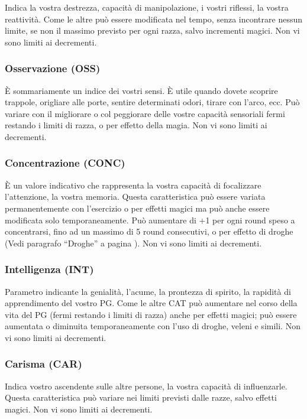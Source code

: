 Indica la vostra destrezza, capacit\`a di manipolazione, i vostri
riflessi, la vostra reattivit\`a. Come le altre pu\`o essere
modificata nel tempo, senza incontrare nessun limite, se non il
massimo previsto per ogni razza, salvo incrementi magici. Non vi sono
limiti ai decrementi.

\subsubsection{Osservazione (OSS)}

\`E sommariamente un indice dei vostri sensi. \`E utile quando dovete
scoprire trappole, origliare alle porte, sentire determinati odori,
tirare con l'arco, ecc. Pu\`o variare con il migliorare o col
peggiorare delle vostre capacit\`a sensoriali fermi restando i limiti
di razza, o per effetto della magia. Non vi sono limiti ai decrementi.

\subsubsection{Concentrazione (CONC)}

\`E un valore indicativo che rappresenta la vostra capacit\`a di
focalizzare l'attenzione, la vostra memoria. Questa caratteristica
pu\`o essere variata permanentemente con l'esercizio o per effetti
magici ma pu\`o anche essere modificata solo temporaneamente.
Pu\`o aumentare di +1 per ogni round speso a concentrarsi, fino ad un
massimo di 5 round consecutivi, o per effetto di droghe (Vedi paragrafo
``Droghe'' a pagina \pageref{droghe}). Non vi sono limiti ai
decrementi.

\subsubsection{Intelligenza (INT)}

Parametro indicante la genialit\`a, l'acume, la prontezza di spirito,
la rapidit\`a di apprendimento del vostro PG. Come le altre CAT
pu\`o aumentare nel corso della vita del PG (fermi restando i limiti
di razza) anche per effetti magici; pu\`o essere aumentata o diminuita
temporaneamente con l'uso di droghe, veleni e simili. Non vi sono
limiti ai decrementi.

\subsubsection{Carisma (CAR)}

Indica vostro ascendente sulle altre persone, la vostra capacit\`a di
influenzarle.  Questa caratteristica pu\`o variare nei limiti
previsti dalle razze, salvo effetti magici. Non vi sono limiti ai
decrementi.
